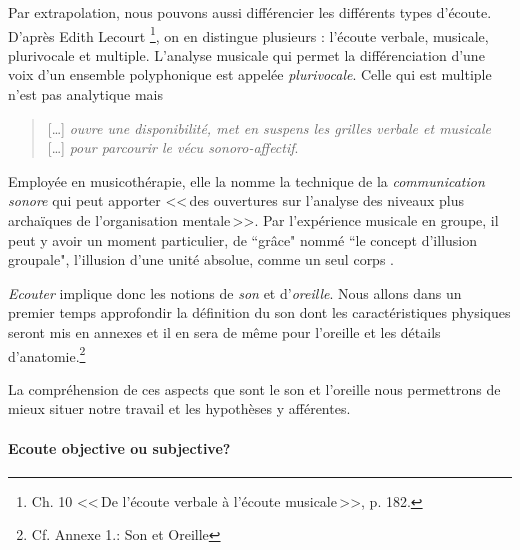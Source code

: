 Par extrapolation, nous pouvons aussi différencier les différents types d'écoute. D'après Edith Lecourt \autocite {lecourt:decouvrir}\footnote{Ch. 10 <<\,De l'écoute verbale à l'écoute musicale\,>>, p. 182.},
on en distingue plusieurs : l'écoute verbale, musicale, plurivocale et multiple.
 L'analyse musicale qui permet la différenciation d'une voix d'un ensemble polyphonique est appelée \emph{plurivocale}. Celle qui est multiple n'est pas analytique  mais
 \begin{quote}
 	 [\ldots] \textit{ouvre une disponibilité, met en suspens les grilles verbale et musicale} [\ldots] \emph{pour parcourir le vécu sonoro-affectif}\autocite[p. 183]{lecourt:decouvrir}.
 \end{quote}
 Employée en musicothérapie, elle la nomme la technique de la  \emph{communication sonore} qui peut apporter
 <<\,des ouvertures sur l'analyse des niveaux plus archaïques de l'organisation mentale\,>>\autocite[p. 154]{lecourt:decouvrir}.
 Par l'expérience musicale en groupe, il peut y avoir un moment
 particulier, de ``grâce"  nommé ``le concept d'illusion groupale",
 l'illusion d'une unité absolue, comme un seul corps \autocite{anzieu:groupal}.

\emph{Ecouter} implique donc les notions de \emph{son} et
d'\emph{oreille}. Nous allons dans un premier temps approfondir  la
définition du son dont les caractéristiques physiques seront mis en
annexes et il en sera de même pour l'oreille et les détails
d'anatomie.\footnote{Cf. Annexe 1.: Son et Oreille}


La compréhension de ces aspects que sont le son et l'oreille nous
permettrons de mieux situer notre travail et les hypothèses y afférentes.








\paragraph{Ecoute objective ou subjective?}

